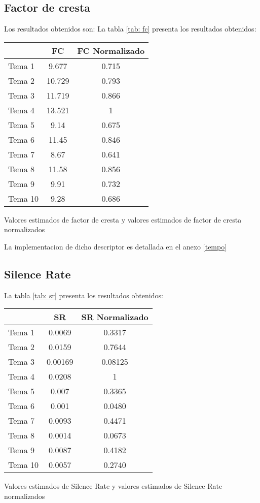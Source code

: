 \documentclass[]{article}
\makeatletter
\newcommand{\tabla}[4]{
\begin{tablehere}
\begin{center}
\begin{tabular}{#1}
#2
\end{tabular}
\caption{#3}
\label{#4}
\end{center}
\end{tablehere}
}
\newenvironment{tablehere}    %
  {\def\@captype{table}}    %

  {}              %
\makeatother
\begin{document}
\begin{multicols}{2}
\subsection{Factor de cresta}
Los resultados obtenidos son:
La tabla \ref{tab: fc} presenta los resultados obtenidos:
\vspace{0.3 cm}
\tabla
{|l|c|c|}
{
\hline
        & FC	& FC Normalizado \\
\hline
Tema 1	& 9.677	&0.715 \\
\hline
Tema 2	& 10.729	& 0.793 \\
\hline
Tema 3	& 11.719	& 0.866 \\
\hline
Tema 4	& 13.521	& 1  \\
\hline
Tema 5	& 9.14	& 0.675 \\
\hline
Tema 6	& 11.45	& 0.846 \\
\hline
Tema 7	& 8.67	& 0.641 \\
\hline
Tema 8	& 11.58	& 0.856\\
\hline
Tema 9	& 9.91	& 0.732 \\
\hline
Tema 10	& 9.28	& 0.686 \\
\hline
}
{Valores estimados de factor de cresta y valores estimados de factor de cresta normalizados}
{tab: fc}

La implementacion de dicho descriptor es detallada en el anexo \ref{tempo}

\subsection{Silence Rate}
La tabla \ref{tab: sr} presenta los resultados obtenidos:
\vspace{0.3 cm}
\tabla
{|l|c|c|}
{
\hline
& SR	& SR Normalizado \\
\hline
Tema 1 &	0.0069 &	0.3317 \\
\hline
Tema 2	& 0.0159	& 0.7644 \\
\hline
Tema 3 &	0.00169 &	0.08125 \\
\hline
Tema 4 &	 0.0208	&  1 \\
\hline
Tema 5	&  0.007  &	0.3365 \\
\hline
Tema 6  &	0.001	 & 0.0480 \\
\hline
Tema 7	&  0.0093	 & 0.4471 \\
\hline
Tema 8  &	0.0014  &	0.0673 \\
\hline
Tema 9	&  0.0087 &	0.4182 \\
\hline
Tema 10	&  0.0057 &	0.2740 \\
\hline
}
{Valores estimados de Silence Rate y valores estimados de Silence Rate normalizados}
{tab: sr}


\end{multicols}
\end{document}
